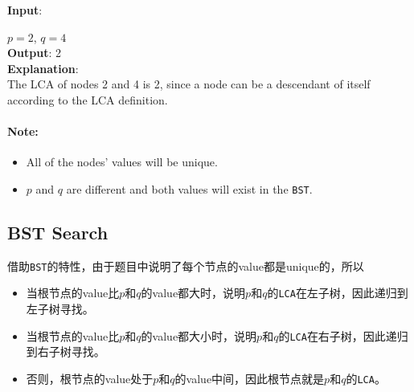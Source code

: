 \begin{flushleft}
\textbf{Input}:
\begin{figure}[H]
\end{figure}
$p = 2$, $q = 4$
\\
\textbf{Output}: 2
\\
\textbf{Explanation}: 
\\
The LCA of nodes 2 and 4 is 2, since a node can be a descendant of itself according to the LCA definition.
\end{flushleft}

\paragraph{Note:}

\begin{itemize}
\item All of the nodes' values will be unique.
\item $p$ and $q$ are different and both values will exist in the \texttt{BST}.
\end{itemize}
\subsection{BST Search}

借助\texttt{BST}的特性，由于题目中说明了每个节点的value都是unique的，所以
\begin{itemize}
\item 当根节点的value比$p$和$q$的value都大时，说明$p$和$q$的\texttt{LCA}在左子树，因此递归到左子树寻找。
\item 当根节点的value比$p$和$q$的value都大小时，说明$p$和$q$的\texttt{LCA}在右子树，因此递归到右子树寻找。
\item 否则，根节点的value处于$p$和$q$的value中间，因此根节点就是$p$和$q$的\texttt{LCA}。
\end{itemize}

